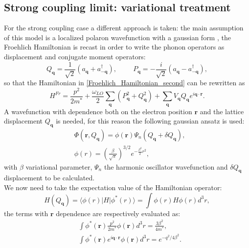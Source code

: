 \subsection{Strong coupling limit: variational treatment}
For the strong coupling case a different approach is taken: the main assumption of this model is a localized polaron wavefunction with 
a gaussian form \cite{mahan2013many}, the Froehlich Hamiltonian is recast in order to write the phonon operators as displacement and 
conjugate moment operators:
\begin{equation}
    Q_\mathbf{q}=\frac{1}{\sqrt{2}}\left(a_\mathbf{q}+a^\dagger_{-\mathbf{q}}\right),\hspace{1cm}P_\mathbf{q}=-\frac{i}{\sqrt{2}}\left(a_\mathbf{q}-a^\dagger_{-\mathbf{q}}\right),
\end{equation}
so that the Hamiltonian in \ref{Froehlich_Hamiltonian_second} can be rewritten as
\begin{equation}
    H^{Fr}=\frac{p^2}{2m^*}+\frac{\omega_{LO}}{2}\sum_{\mathbf{q}}\left(P^2_\mathbf{q}+Q^2_\mathbf{q}\right)+\sum_\mathbf{q}V_\mathbf{q}Q_\mathbf{q}e^{i\mathbf{q}\cdot\mathbf{r}}.
\end{equation}
A wavefunction with dependence both on the electron position $\mathbf{r}$ and the lattice displacement $Q_\mathbf{q}$ is needed, for 
this reason the following gaussian ansatz is used:
\begin{equation}
\begin{split}
    &\Phi(\mathbf{r},Q_\mathbf{q})=\phi(\mathbf{r})\Psi_n(Q_\mathbf{q}+\delta Q_\mathbf{q}),\\
    &\phi(r)=\left(\frac{\beta}{\sqrt{\pi}}\right)^{3/2}e^{-\frac{\beta^2}{2}r^2},
\end{split}
\end{equation}
with $\beta$ variational parameter, $\Psi_n$ the harmonic oscillator wavefunction and $\delta Q_\mathbf{q}$ displacement to be 
calculated.\\
We now need to take the expectation value of the Hamiltonian operator:
\begin{equation}
    H(Q_\mathbf{q})=\langle \phi(r)|H|\phi^*(r)\rangle=\int \phi(r)H\phi(r)d^3r,
\end{equation}
the terms with $\mathbf{r}$ dependence are respectively evaluated as:
\begin{equation}
\begin{split}
    &\int\phi^*(\mathbf{r})\frac{p^2}{2m^*}\phi(\mathbf{r})d^3r=\frac{3\beta^2}{4m^*},\\
    &\int \phi^*(\mathbf{r})e^{i\mathbf{q}\cdot\mathbf{r}}\phi(\mathbf{r})d^3r=e^{-q^2/4\beta^2}.
\end{split}
\end{equation}
